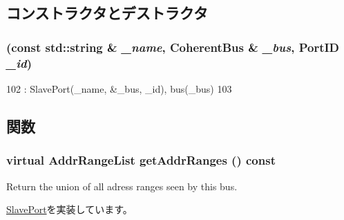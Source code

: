 \subsection{コンストラクタとデストラクタ}
\hypertarget{classCoherentBus_1_1CoherentBusSlavePort_ab33070885fab9d6b96607c346b03be7b}{
\subsubsection[{CoherentBusSlavePort}]{ (const std::string \& {\em \_\-name}, \/  {\bf CoherentBus} \& {\em \_\-bus}, \/  {\bf PortID} {\em \_\-id})}}
\label{classCoherentBus_1_1CoherentBusSlavePort_ab33070885fab9d6b96607c346b03be7b}



\begin{DoxyCode}
102             : SlavePort(_name, &_bus, _id), bus(_bus)
103         { }
\end{DoxyCode}


\subsection{関数}
\hypertarget{classCoherentBus_1_1CoherentBusSlavePort_a9367d737cb872cb8573f44b501f99363}{
\subsubsection[{getAddrRanges}]{\setlength{\rightskip}{0pt plus 5cm}virtual {\bf AddrRangeList} getAddrRanges () const}}
\label{classCoherentBus_1_1CoherentBusSlavePort_a9367d737cb872cb8573f44b501f99363}
Return the union of all adress ranges seen by this bus. 

\hyperlink{classSlavePort_a6e967f8921e80748eb2be35b6b481a7e}{SlavePort}を実装しています。


